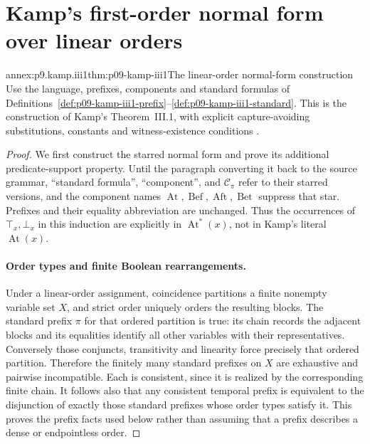 
\section{Kamp's first-order normal form over linear orders}
\label{sec:annex-p09-kamp-iii1}

\begin{annexitem}{annex:p9.kamp.iii1}{thm:p09-kamp-iii1}{The linear-order normal-form construction}
Use the language, prefixes, components and standard formulas of
Definitions~\ref{def:p09-kamp-iii1-prefix}--\ref{def:p09-kamp-iii1-standard}.
This is the construction of Kamp's Theorem~III.1, with explicit
capture-avoiding substitutions, constants and witness-existence conditions
\cite[ch.~III, pp.~43--56]{Kamp1968}.

\begin{proof}
We first construct the starred normal form and prove its additional
predicate-support property.  Until the paragraph converting it back to the
source grammar, ``standard formula'', ``component'', and
\(\mathcal C_\pi\) refer to their starred versions, and the component
names \(\operatorname{At},\operatorname{Bef},\operatorname{Aft},
\operatorname{Bet}\) suppress that star.  Prefixes and their equality
abbreviation are unchanged.  Thus the occurrences of \(\top_x,\bot_x\)
in this induction are explicitly in \(\operatorname{At}^{*}(x)\), not
in Kamp's literal \(\operatorname{At}(x)\).

\paragraph{Order types and finite Boolean rearrangements.}
Under a linear-order assignment, coincidence partitions a finite nonempty
variable set \(X\), and strict order uniquely orders the resulting blocks.
The standard prefix \(\pi\) for that ordered partition is true: its chain
records the adjacent blocks and its equalities identify all other variables
with their representatives.  Conversely those conjuncts, transitivity and
linearity force precisely that ordered partition.  Therefore the finitely
many standard prefixes on \(X\) are exhaustive and pairwise incompatible.
Each is consistent, since it is realized by the corresponding finite chain.
It follows also that any consistent temporal prefix is equivalent to the
disjunction of exactly those standard prefixes whose order types satisfy
it.  This proves the prefix facts used below rather than assuming that a
prefix describes a dense or endpointless order.


\end{proof}
\end{annexitem}
